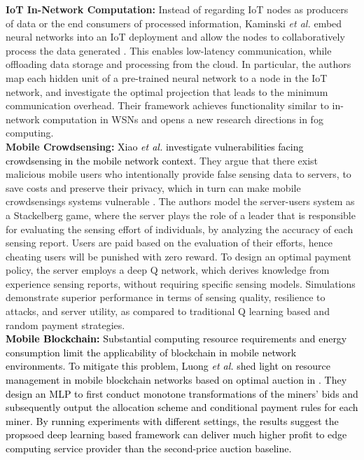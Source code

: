 \documentclass[journal,comsoc,letter]{IEEEtran}
\newcommand{\edit}[1]{\textcolor{black}{#1}}
\newcommand{\rev}[1]{\textcolor{black}{#1}}
\begin{document}
\noindent\textbf{IoT In-Network Computation:} Instead of regarding IoT nodes as producers of data or the end consumers of processed information, Kaminski \emph{et al.} embed neural networks into an IoT deployment and allow the nodes to collaboratively process the data generated \cite{kaminski2017neural}. This enables low-latency communication, while offloading data storage and processing from the cloud. In particular, the authors map each hidden unit of a pre-trained neural network to a node in the IoT network, and investigate the optimal projection that leads to the minimum communication overhead. Their framework achieves functionality similar to in-network computation in WSNs and opens a new research directions in fog computing. \\

\noindent\textbf{Mobile Crowdsensing:}  \rev{Xiao \emph{et al.} investigate vulnerabilities facing crowdsensing in the mobile network context.} They argue that there exist malicious mobile users who intentionally provide false sensing data to servers, to save costs and preserve their privacy, which in turn can make mobile crowdsensings systems vulnerable \cite{xiao2017secure}. The authors model the server-users system as a Stackelberg game, where the server plays the role of a leader that is responsible for evaluating the sensing effort of individuals, by analyzing the accuracy of each sensing report. Users are paid based on the evaluation of their efforts, hence cheating users will be punished with zero reward. To design an optimal payment policy, the server employs a deep Q network, which derives knowledge from experience sensing reports, without requiring specific sensing models. Simulations demonstrate superior performance in terms of sensing quality, resilience to attacks, and server utility, as compared to traditional Q learning based and random payment strategies.\\



\noindent\edit{\textbf{Mobile Blockchain:} \rev{Substantial computing resource requirements and energy consumption limit the applicability of blockchain in mobile network environments.}
To mitigate this problem, Luong \emph{et al.} shed light on resource management in mobile blockchain networks based on optimal auction in \cite{luong2018optimal}.  They design an MLP to first conduct monotone transformations of the miners' bids and subsequently output the allocation scheme and conditional payment rules for each miner.  By running experiments with different settings, the results suggest the propsoed deep learning based framework can deliver much higher profit to edge computing service provider than the second-price auction baseline. }\\
\end{document}
